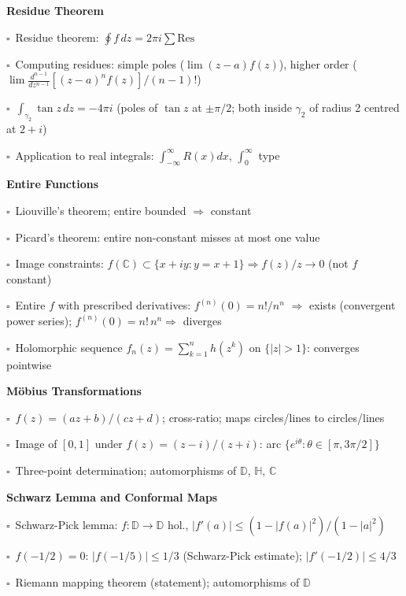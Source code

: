 \documentclass[11pt,a4paper]{article}
\newcommand{\chk}{\textcolor{rulegray}{$\square$}\ }
\begin{document}
\begin{subtopics}
  \item \textbf{Residue Theorem}
  \begin{subtopics}
    \item \chk Residue theorem: $\oint f\,dz=2\pi i\sum\mathrm{Res}$
    \item \chk Computing residues: simple poles ($\lim(z-a)f(z)$), higher order ($\lim\frac{d^{n-1}}{dz^{n-1}}[(z-a)^nf(z)]/(n-1)!$)
    \item \chk $\int_{\gamma_2}\tan z\,dz=-4\pi i$ (poles of $\tan z$ at $\pm\pi/2$; both inside $\gamma_2$ of radius 2 centred at $2+i$)
    \item \chk Application to real integrals: $\int_{-\infty}^\infty R(x)dx$, $\int_0^\infty$ type
  \end{subtopics}

  \item \textbf{Entire Functions}
  \begin{subtopics}
    \item \chk Liouville's theorem; entire bounded $\Rightarrow$ constant
    \item \chk Picard's theorem: entire non-constant misses at most one value
    \item \chk Image constraints: $f(\mathbb{C})\subset\{x+iy: y=x+1\} \Rightarrow f(z)/z\to 0$ (not $f$ constant)
    \item \chk Entire $f$ with prescribed derivatives: $f^{(n)}(0)=n!/n^n$ $\Rightarrow$ exists (convergent power series); $f^{(n)}(0)=n!\,n^n \Rightarrow$ diverges
    \item \chk Holomorphic sequence $f_n(z)=\sum_{k=1}^n h(z^k)$ on $\{|z|>1\}$: converges pointwise
  \end{subtopics}

  \item \textbf{M\"{o}bius Transformations}
  \begin{subtopics}
    \item \chk $f(z)=(az+b)/(cz+d)$; cross-ratio; maps circles/lines to circles/lines
    \item \chk Image of $[0,1]$ under $f(z)=(z-i)/(z+i)$: arc $\{e^{i\theta}:\theta\in[\pi,3\pi/2]\}$
    \item \chk Three-point determination; automorphisms of $\mathbb{D}$, $\mathbb{H}$, $\mathbb{C}$
  \end{subtopics}

  \item \textbf{Schwarz Lemma and Conformal Maps}
  \begin{subtopics}
    \item \chk Schwarz-Pick lemma: $f:\mathbb{D}\to\mathbb{D}$ hol., $|f'(a)|\le(1-|f(a)|^2)/(1-|a|^2)$
    \item \chk $f(-1/2)=0$: $|f(-1/5)|\le 1/3$ (Schwarz-Pick estimate); $|f'(-1/2)|\le 4/3$
    \item \chk Riemann mapping theorem (statement); automorphisms of $\mathbb{D}$
  \end{subtopics}

\end{subtopics}
\end{document}
